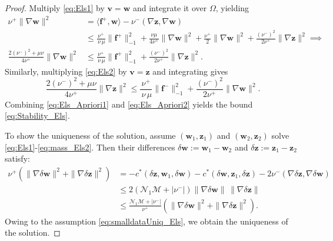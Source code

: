 \documentclass[10pt,a4paper]{amsart}
\def\V#1{\mathbf{#1}}
\def\fminus{\mathbf{f}^{-}}
\def\fplus{\mathbf{f}^{+}}
\def\numinus{\nu^{-}}
\def\nuplus{\nu^{+}}
\newcommand{\Mbd}{\mathcal{M}}
\newcommand{\Nbd}{\mathcal{N}}
\begin{document}
\begin{proof}
Multiply \eqref{eq:Els1} by $\V{v}=\V{w}$ and integrate it over $\Omega$, yielding 
\begin{equation}
\label{eq:Els_Apriori1}
\begin{aligned}
\nuplus \|\nabla \V{w}\|^2 &= 
\langle \fplus,\V{w} \rangle
- \numinus (\nabla \V{z},\nabla \V{w})\\
& \le \frac{\nuplus}{\, \nu \, \mu}\|\fplus\|^2_{-1} + \frac{\nu \mu}{4\nuplus}\|\nabla \V{w}\|^2
+ \frac{\nuplus}{2}\|\nabla \V{w}\|^2
+ \frac{(\numinus)^2}{2\nuplus}\|\nabla \V{z}\|^2 \implies \\
\frac{2 (\numinus)^2+\mu\nu}{4 \nuplus}\|\nabla \V{w}\|^2 & \le \frac{\nuplus}{\, \nu \, \mu}\|\fplus\|^2_{-1}
+ \frac{(\numinus)^2}{2\nuplus}\|\nabla \V{z}\|^2.
 \end{aligned}
 \end{equation}
 Similarly, multiplying \eqref{eq:Els2} by $\V{v}=\V{z}$ and integrating gives
\begin{equation}
    \label{eq:Els_Apriori2}
    \frac{2 (\numinus)^2+\mu\nu}{4 \nuplus}\|\nabla \V{z}\|^2  \le \frac{\nuplus}{\, \nu \, \mu}\|\fminus\|^2_{-1}
+ \frac{(\numinus)^2}{2\nuplus}\|\nabla \V{w}\|^2.
\end{equation}
Combining \eqref{eq:Els_Apriori1} and \eqref{eq:Els_Apriori2} yields the bound \eqref{eq:Stability_Els}. 

To show the uniqueness of the solution, assume $(\V{w}_1,\V{z}_1)$ and $(\V{w}_2,\V{z}_2)$ solve \eqref{eq:Els1}-\eqref{eq:mass_Els2}. Then their differences $\delta \V{w}:=\V{w}_1-\V{w}_2$ and $\delta \V{z}:=\V{z}_1-\V{z}_2$ satisfy:
\begin{equation}\label{eq:Uniquness_Els1}
\begin{aligned}  
\nuplus (\| \nabla \delta \V{w}\|^2+\| \nabla \delta \V{z}\|^2)
& = - c^*(\delta \V{z}, \V{w}_1, \delta \V{w}) - c^*(\delta \V{w}, \V{z}_1, \delta \V{z}) - 2\numinus (\nabla \delta \V{z}, \nabla  \delta \V{w}) \\ 
& \le 2(\Nbd_1 \Mbd + |\numinus|) \| \nabla \delta \V{w}\|\, \| \nabla \delta \V{z}\| \\ 
& \le \frac{\Nbd_1 \Mbd + |\numinus|}{\nuplus}(\| \nabla \delta \V{w}\|^2+\| \nabla \delta \V{z}\|^2).
\end{aligned}
\end{equation}
Owing to the assumption \eqref{eq:smalldataUniq_Els}, we obtain the uniqueness of the solution.
\end{proof}
\end{document}
